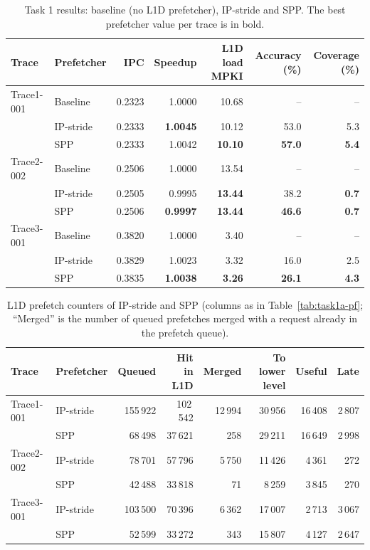 \documentclass[11pt,a4paper]{article}
\begin{document}
\begin{table}[H]
    \centering
    \small
    \begin{tabular}{llrrrrr}
        \toprule
        Trace & Prefetcher & IPC & Speedup & L1D load MPKI & Accuracy (\%) & Coverage (\%) \\
        \midrule
        Trace1-001 & Baseline  & 0.2323 & 1.0000 & 10.68 & --   & --  \\
                   & IP-stride & 0.2333 & \textbf{1.0045} & 10.12 & 53.0 & 5.3 \\
                   & SPP       & 0.2333 & 1.0042 & \textbf{10.10} & \textbf{57.0} & \textbf{5.4} \\
        \midrule
        Trace2-002 & Baseline  & 0.2506 & 1.0000 & 13.54 & --   & --  \\
                   & IP-stride & 0.2505 & 0.9995 & \textbf{13.44} & 38.2 & \textbf{0.7} \\
                   & SPP       & 0.2506 & \textbf{0.9997} & \textbf{13.44} & \textbf{46.6} & \textbf{0.7} \\
        \midrule
        Trace3-001 & Baseline  & 0.3820 & 1.0000 & 3.40  & --   & --  \\
                   & IP-stride & 0.3829 & 1.0023 & 3.32  & 16.0 & 2.5 \\
                   & SPP       & 0.3835 & \textbf{1.0038} & \textbf{3.26} & \textbf{26.1} & \textbf{4.3} \\
        \bottomrule
    \end{tabular}
    \caption{Task 1 results: baseline (no L1D prefetcher), IP-stride and SPP. The best prefetcher
    value per trace is in bold.}
    \label{tab:task1-main}
\end{table}

\begin{table}[H]
    \centering
    \begin{tabular}{llrrrrrr}
        \toprule
        Trace & Prefetcher & Queued & Hit in L1D & Merged & To lower level & Useful & Late \\
        \midrule
        Trace1-001 & IP-stride & 155\,922 & 102\,542 & 12\,994 & 30\,956 & 16\,408 & 2\,807 \\
                   & SPP       & 68\,498  & 37\,621  & 258     & 29\,211 & 16\,649 & 2\,998 \\
        \midrule
        Trace2-002 & IP-stride & 78\,701  & 57\,796  & 5\,750  & 11\,426 & 4\,361  & 272    \\
                   & SPP       & 42\,488  & 33\,818  & 71      & 8\,259  & 3\,845  & 270    \\
        \midrule
        Trace3-001 & IP-stride & 103\,500 & 70\,396  & 6\,362  & 17\,007 & 2\,713  & 3\,067 \\
                   & SPP       & 52\,599  & 33\,272  & 343     & 15\,807 & 4\,127  & 2\,647 \\
        \bottomrule
    \end{tabular}
    \caption{L1D prefetch counters of IP-stride and SPP (columns as in Table~\ref{tab:task1a-pf};
    ``Merged'' is the number of queued prefetches merged with a request already in the
    prefetch queue).}
    \label{tab:task1-pf}
\end{table}
\end{document}
